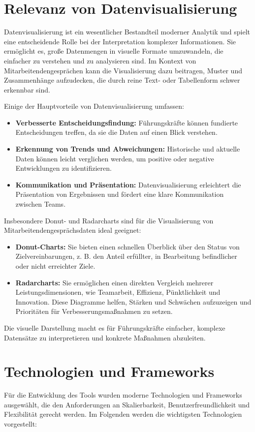 \section{Relevanz von Datenvisualisierung}
Datenvisualisierung ist ein wesentlicher Bestandteil moderner Analytik und spielt eine entscheidende Rolle bei der Interpretation komplexer Informationen. Sie ermöglicht es, große Datenmengen in visuelle Formate umzuwandeln, die einfacher zu verstehen und zu analysieren sind. Im Kontext von Mitarbeitendengesprächen kann die Visualisierung dazu beitragen, Muster und Zusammenhänge aufzudecken, die durch reine Text- oder Tabellenform schwer erkennbar sind.

Einige der Hauptvorteile von Datenvisualisierung umfassen:
\begin{itemize}
    \item \textbf{Verbesserte Entscheidungsfindung:} Führungskräfte können fundierte Entscheidungen treffen, da sie die Daten auf einen Blick verstehen.
    \item \textbf{Erkennung von Trends und Abweichungen:} Historische und aktuelle Daten können leicht verglichen werden, um positive oder negative Entwicklungen zu identifizieren.
    \item \textbf{Kommunikation und Präsentation:} Datenvisualisierung erleichtert die Präsentation von Ergebnissen und fördert eine klare Kommunikation zwischen Teams.
\end{itemize}

Insbesondere Donut- und Radarcharts sind für die Visualisierung von Mitarbeitendengesprächsdaten ideal geeignet:
\begin{itemize}
    \item \textbf{Donut-Charts:} Sie bieten einen schnellen Überblick über den Status von Zielvereinbarungen, z. B. den Anteil erfüllter, in Bearbeitung befindlicher oder nicht erreichter Ziele.
    \item \textbf{Radarcharts:} Sie ermöglichen einen direkten Vergleich mehrerer Leistungsdimensionen, wie Teamarbeit, Effizienz, Pünktlichkeit und Innovation. Diese Diagramme helfen, Stärken und Schwächen aufzuzeigen und Prioritäten für Verbesserungsmaßnahmen zu setzen.
\end{itemize}

Die visuelle Darstellung macht es für Führungskräfte einfacher, komplexe Datensätze zu interpretieren und konkrete Maßnahmen abzuleiten.

\section{Technologien und Frameworks}
Für die Entwicklung des Tools wurden moderne Technologien und Frameworks ausgewählt, die den Anforderungen an Skalierbarkeit, Benutzerfreundlichkeit und Flexibilität gerecht werden. Im Folgenden werden die wichtigsten Technologien vorgestellt:

